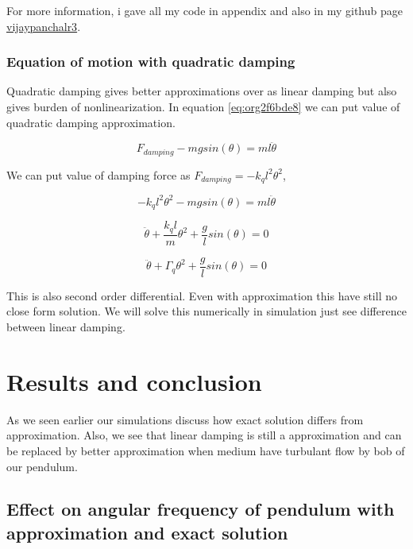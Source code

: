 \documentclass{article}
\begin{document}
For more information, i gave all my code in appendix and also in my github page \href{https://github.com/vijaypanchalr3}{vijaypanchalr3}.

\subsubsection{Equation of motion with quadratic damping}
\label{sec:orgb335451}

Quadratic damping gives better approximations over as linear damping but also gives burden of nonlinearization. In equation \ref{eq:org2f6bde8} we can put value of quadratic damping approximation. 

\begin{equation*}
F_{damping}-mgsin(\theta)=ml\ddot{\theta}
\end{equation*}

We can put value of damping force as \(F_{damping} = -k_{q}l^{2}\theta^{2}\),

\begin{equation*}
-k_{q}l^{2}\theta^{2}-mgsin(\theta)=ml\ddot{\theta}
\end{equation*}

\begin{equation*}
\ddot{\theta}+\frac{k_{q}l}{m}\theta^{2}+\frac{g}{l}sin(\theta)=0
\end{equation*}

\begin{equation*}
\ddot{\theta}+\Gamma_{q}\theta^{2}+\frac{g}{l}sin(\theta)=0
\end{equation*}

This is also second order differential. Even with approximation this have still no close form solution. We will solve this numerically in simulation just see difference between linear damping.

\section{Results and conclusion}
\label{sec:org883c01d}

As we seen earlier our simulations discuss how exact solution differs from approximation. Also, we see that linear damping is still a approximation and can be replaced by better approximation when medium have turbulant flow by bob of our pendulum.

\subsection{Effect on angular frequency of pendulum with approximation and exact solution}
\label{sec:org12c1446}
\end{document}
